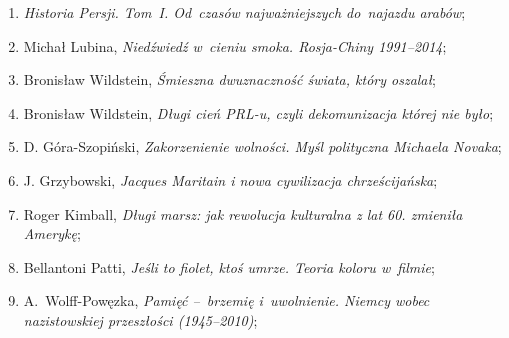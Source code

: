\documentclass[a4paper,11pt]{article}
\begin{document}
\begin{enumerate}
\item \emph{Historia Persji. Tom~I. Od~czasów najważniejszych
    do~najazdu arabów};

\item Michał Lubina, \emph{Niedźwiedź w~cieniu smoka. Rosja-Chiny
    1991--2014};

\item Bronisław Wildstein, \emph{Śmieszna dwuznaczność świata, który
    oszalał};

\item Bronisław Wildstein, \emph{Długi cień PRL-u, czyli dekomunizacja
    której nie było};

\item D. Góra-Szopiński, \emph{Zakorzenienie wolności. Myśl polityczna
    Michaela Novaka};

\item J. Grzybowski, \emph{Jacques Maritain i nowa cywilizacja
    chrześcijańska};

\item Roger Kimball, \emph{Długi marsz: jak rewolucja kulturalna z lat
    60. zmieniła Amerykę};

\item Bellantoni Patti, \emph{Jeśli to fiolet, ktoś umrze. Teoria
    koloru w~filmie};

\item A.~Wolff-Powęzka, \emph{Pamięć --~brzemię i~uwolnienie.
    Niemcy wobec nazistowskiej przeszłości (1945--2010)};





































































\end{enumerate}
\end{document}
